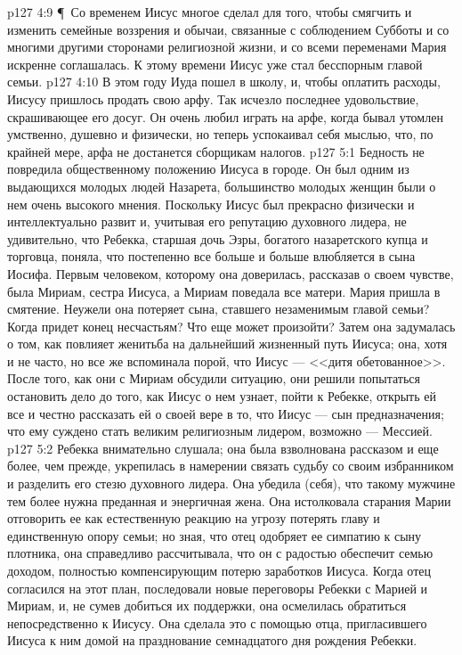 \vs p127 4:9 \P\ Со временем Иисус многое сделал для того, чтобы смягчить и изменить семейные воззрения и обычаи, связанные с соблюдением Субботы и со многими другими сторонами религиозной жизни, и со всеми переменами Мария искренне соглашалась. К этому времени Иисус уже стал бесспорным главой семьи.
\vs p127 4:10 В этом году Иуда пошел в школу, и, чтобы оплатить расходы, Иисусу пришлось продать свою арфу. Так исчезло последнее удовольствие, скрашивающее его досуг. Он очень любил играть на арфе, когда бывал утомлен умственно, душевно и физически, но теперь успокаивал себя мыслью, что, по крайней мере, арфа не достанется сборщикам налогов.
\vs p127 5:1 Бедность не повредила общественному положению Иисуса в городе. Он был одним из выдающихся молодых людей Назарета, большинство молодых женщин были о нем очень высокого мнения. Поскольку Иисус был прекрасно физически и интеллектуально развит и, учитывая его репутацию духовного лидера, не удивительно, что Ребекка, старшая дочь Эзры, богатого назаретского купца и торговца, поняла, что постепенно все больше и больше влюбляется в сына Иосифа. Первым человеком, которому она доверилась, рассказав о своем чувстве, была Мириам, сестра Иисуса, а Мириам поведала все матери. Мария пришла в смятение. Неужели она потеряет сына, ставшего незаменимым главой семьи? Когда придет конец несчастьям? Что еще может произойти? Затем она задумалась о том, как повлияет женитьба на дальнейший жизненный путь Иисуса; она, хотя и не часто, но все же вспоминала порой, что Иисус --- <<дитя обетованное>>. После того, как они с Мириам обсудили ситуацию, они решили попытаться остановить дело до того, как Иисус о нем узнает, пойти к Ребекке, открыть ей все и честно рассказать ей о своей вере в то, что Иисус --- сын предназначения; что ему суждено стать великим религиозным лидером, возможно --- Мессией.
\vs p127 5:2 Ребекка внимательно слушала; она была взволнована рассказом и еще более, чем прежде, укрепилась в намерении связать судьбу со своим избранником и разделить его стезю духовного лидера. Она убедила (себя), что такому мужчине тем более нужна преданная и энергичная жена. Она истолковала старания Марии отговорить ее как естественную реакцию на угрозу потерять главу и единственную опору семьи; но зная, что отец одобряет ее симпатию к сыну плотника, она справедливо рассчитывала, что он с радостью обеспечит семью доходом, полностью компенсирующим потерю заработков Иисуса. Когда отец согласился на этот план, последовали новые переговоры Ребекки с Марией и Мириам, и, не сумев добиться их поддержки, она осмелилась обратиться непосредственно к Иисусу. Она сделала это с помощью отца, пригласившего Иисуса к ним домой на празднование семнадцатого дня рождения Ребекки.
